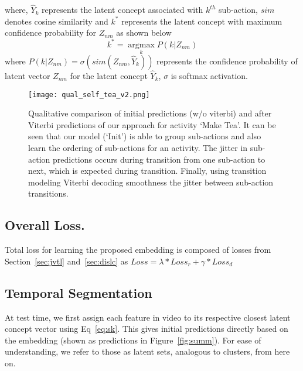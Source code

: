 \documentclass[final]{cvpr}
\begin{document}
\noindent where, $\widehat{Y}_{k}$ represents the latent concept associated with $k^{th}$ sub-action, $sim$ denotes cosine similarity and $k^{*}$ represents the latent concept with maximum confidence probability for $Z_{nm}$ as shown below
\vspace{-0.2cm}
\begin{equation}
    k^{*} = {\operatorname*{argmax}_{k}} P( k | Z_{nm})
\label{eq:sk} 
\end{equation}
\noindent where {\small $P( k | Z_{nm})=  \sigma(sim(Z_{nm}, \widehat{Y}_{k}))$} represents the confidence probability of latent vector $Z_{nm}$ for the latent concept $\widehat{Y}_{k}$, $\sigma$ is softmax activation. 


\begin{figure}[t]
\texttt{[image: qual\_self\_tea\_v2.png]}
\caption{{\small Qualitative comparison of initial predictions (w/o viterbi) and after Viterbi predictions of our approach for activity `Make Tea'. It can be seen that our model (`Init') is able to group sub-actions and also learn the ordering of sub-actions for an activity. The jitter in sub-action predictions occurs during transition from one sub-action to next, which is expected during transition. Finally, using transition modeling Viterbi decoding smoothness the jitter between sub-action transitions. 
}}
\vspace{-0.2cm}
\label{fig:qual_detail}
\end{figure}

\subsection{Overall Loss.} Total loss for learning the proposed embedding is composed of losses from Section~\ref{sec:jvtl} and~\ref{sec:dislc} as $Loss = \lambda * Loss_{r} + \gamma * Loss_{d}$

\subsection{Temporal Segmentation}

\label{sec:ip} 
At test time, we first assign each feature in video to its respective closest latent concept vector using Eq~\ref{eq:sk}. This gives initial predictions directly based on the embedding (shown as predictions in Figure~\ref{fig:summ}). For ease of understanding, we refer to those as latent sets, analogous to clusters, from here on.
\end{document}
